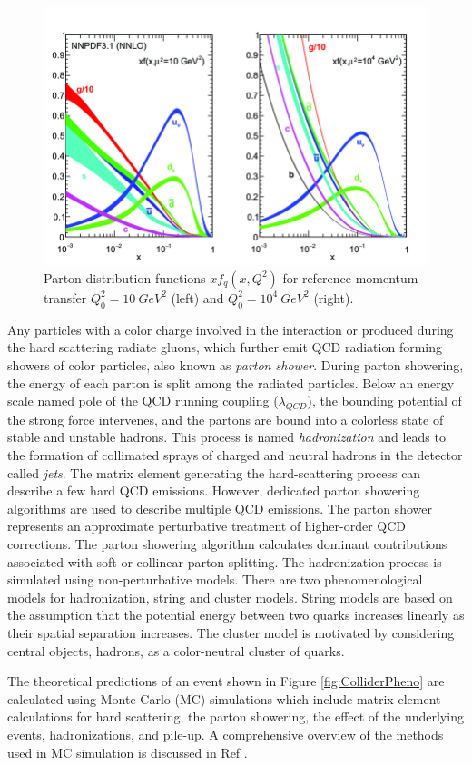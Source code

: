 \begin{figure}[!htbp]
\centering
    \includegraphics[width=1\textwidth] {figures/Theory/PDF.png}\hspace{1cm}
    \caption{ Parton distribution functions $xf_{q}(x,Q^2)$ for reference momentum transfer $Q^2_{0} = 10 ~ GeV^2$ (left) and $Q^2_{0} = 10^4~ GeV^{2}$ (right)\cite{PDFFigure}.}
\label{fig:PDFFig}
\end{figure}

Any particles with a color charge involved in the interaction or produced during the hard scattering radiate gluons, which further emit QCD radiation forming showers of color particles, also known as \textit{parton shower}. During parton showering, the energy of each parton is split among the radiated particles. Below an energy scale named pole of the QCD running coupling ($\lambda_{QCD}$), the bounding potential of the strong force intervenes, and the partons are bound into a colorless state of stable and unstable hadrons. This process is named \textit{hadronization} and leads to the formation of collimated sprays of charged and neutral hadrons in the detector called \textit{jets}. The matrix element generating the hard-scattering process can describe a few hard QCD emissions. However, dedicated parton showering algorithms are used to describe multiple QCD emissions. The parton shower represents an approximate perturbative treatment of higher-order QCD corrections. The parton showering algorithm calculates dominant contributions associated with soft or collinear parton splitting. The hadronization process is simulated using non-perturbative models. There are two phenomenological models for hadronization, string and cluster models. String models are based on the assumption
that the potential energy between two quarks increases linearly as their spatial separation increases. The cluster model is motivated by considering central objects, hadrons, as a color-neutral cluster of quarks.

The theoretical predictions of an event shown in Figure \ref{fig:ColliderPheno} are calculated using Monte Carlo (MC) simulations which include matrix element calculations for hard scattering, the parton showering, the effect of the underlying events, hadronizations, and pile-up. A comprehensive overview of the methods used in MC simulation is discussed in Ref \cite{EventGenerator}.
